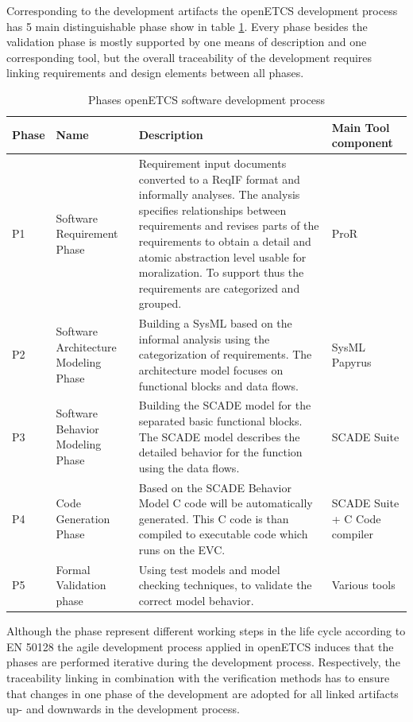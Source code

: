 \documentclass{template/openetcs_report}
\begin{document}
Corresponding to the development artifacts the openETCS development process has 5 main distinguishable phase show in table \ref{tab:DevelopmentPhases}. Every phase besides the validation phase is mostly supported by one means of description and one corresponding tool, but the overall traceability of the development requires linking requirements and design elements between all phases. 

\begin{table}[htbp]
  \centering
  
  \caption{Phases openETCS software development process}
\begin{tabular}{|p{1cm}|p{2cm}|p{7.5cm}|p{2.5cm}|}
\hline \textbf{Phase} & \textbf{Name} & \textbf{Description} & \textbf{Main Tool component} \\ 
\hline P1 & Software Requirement Phase & Requirement input documents converted to a ReqIF format and informally analyses. The analysis specifies relationships between requirements and revises parts of the requirements to obtain a detail and atomic abstraction level usable for moralization. To support thus the requirements are categorized and grouped. & ProR \\ 
\hline P2 & Software Architecture Modeling Phase & Building a SysML based on the informal analysis using the categorization of requirements. The architecture model focuses on functional blocks and data flows. & SysML Papyrus \\ 
\hline P3 & Software Behavior Modeling Phase & Building the SCADE model for the separated basic functional blocks. The SCADE model describes the detailed behavior for the function using the data flows. & SCADE Suite \\ 
\hline P4 & Code Generation Phase & Based on the SCADE Behavior Model C code will be automatically generated. This C code is than compiled to executable code which runs on the EVC. & SCADE Suite + C Code compiler\\
\hline P5 & Formal Validation phase & Using test models and model checking techniques, to validate the correct model behavior.  & Various tools \\ 
\hline 
\end{tabular} 
\label{tab:DevelopmentPhases}
\end{table}

Although the phase represent different working steps in the life cycle according to EN 50128 the agile development process applied in openETCS induces that the phases are performed iterative during the development process. Respectively, the traceability linking in combination with the verification methods has to ensure that changes in one phase of the development are adopted for all linked artifacts up- and downwards in the development process.
\end{document}
